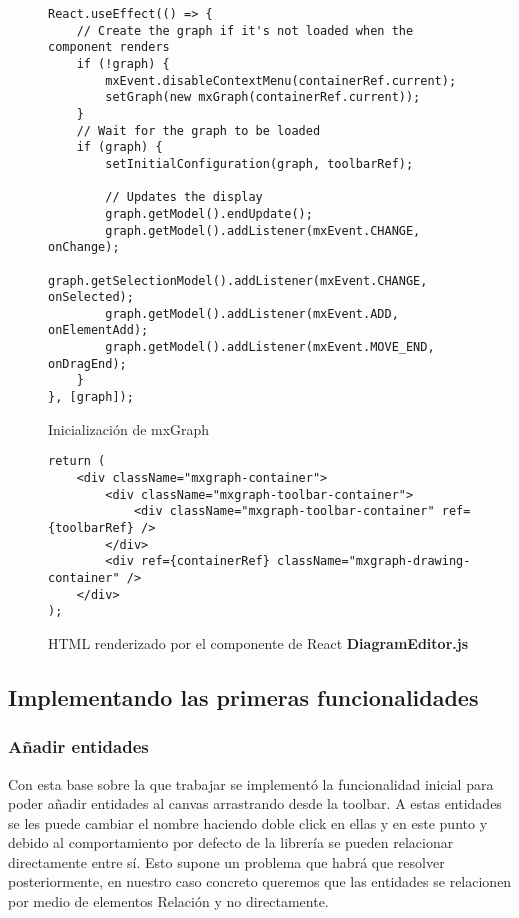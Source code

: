 \begin{figure}
\lstset{breaklines=true, basicstyle=\footnotesize}
\begin{lstlisting}[frame=single]
React.useEffect(() => {
    // Create the graph if it's not loaded when the component renders
    if (!graph) {
        mxEvent.disableContextMenu(containerRef.current);
        setGraph(new mxGraph(containerRef.current));
    }
    // Wait for the graph to be loaded
    if (graph) {
        setInitialConfiguration(graph, toolbarRef);

        // Updates the display
        graph.getModel().endUpdate();
        graph.getModel().addListener(mxEvent.CHANGE, onChange);
        graph.getSelectionModel().addListener(mxEvent.CHANGE, onSelected);
        graph.getModel().addListener(mxEvent.ADD, onElementAdd);
        graph.getModel().addListener(mxEvent.MOVE_END, onDragEnd);
    }
}, [graph]);
\end{lstlisting}
\caption{Inicialización de mxGraph}
\end{figure}


\begin{figure}
\lstset{breaklines=true, basicstyle=\footnotesize}
\begin{lstlisting}[frame=single]
return (
    <div className="mxgraph-container">
        <div className="mxgraph-toolbar-container">
            <div className="mxgraph-toolbar-container" ref={toolbarRef} />
        </div>
        <div ref={containerRef} className="mxgraph-drawing-container" />
    </div>
);
\end{lstlisting}
\caption{HTML renderizado por el componente de React \textbf{DiagramEditor.js}}
\end{figure}

\subsection{Implementando las primeras funcionalidades}
\subsubsection{Añadir entidades}
Con esta base sobre la que trabajar se implementó la funcionalidad inicial para poder añadir entidades al canvas arrastrando desde la toolbar.
A estas entidades se les puede cambiar el nombre haciendo doble click en ellas y en este punto y debido al comportamiento por defecto de la librería se pueden relacionar directamente entre sí. 
Esto supone un problema que habrá que resolver posteriormente, en nuestro caso concreto queremos que las entidades se relacionen por medio de elementos Relación y no directamente.

